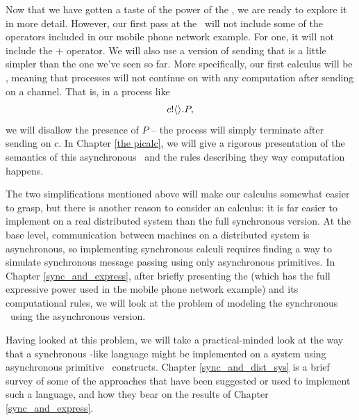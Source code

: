 	Now that we have gotten a taste of the power of the \picalc, we are ready to explore it in more detail.  
However, our first pass at the \picalc\ will not include some of the operators included in our mobile phone network example.  
For one, it will not include the $+$ operator.  
We will also use a version of sending that is a little simpler than the one we've seen so far.  
More specifically, our first calculus will be , meaning that processes will not continue on with any computation after sending on a channel.  
That is, in a process like
\[
	{c}!\langle{}\rangle.P,
\]
we will disallow the presence of $P$ -- the process will simply terminate after sending on $c$.  
In Chapter \ref{the picalc}, we will give a rigorous presentation of the semantics of this asynchronous \picalc\ and the rules describing they way computation happens.

The two simplifications mentioned above will make our calculus somewhat easier to grasp, but there is another reason to consider an  calculus: it is far easier to implement on a real distributed system than the full synchronous version.  
At the base level, communication between machines on a distributed system is asynchronous, so implementing synchronous calculi requires finding a way to simulate synchronous message passing using only asynchronous primitives.  
In Chapter \ref{sync_and_express}, after briefly presenting the  \picalc (which has the full expressive power used in the mobile phone network example) and its computational rules, we will look at the problem of modeling the synchronous \picalc\ using the asynchronous version.

Having looked at this problem, we will take a practical-minded look at the way that a synchronous \picalc-like language might be implemented on a system using asynchronous primitive \picalc\ constructs. 
Chapter \ref{sync_and_dist_sys} is a brief survey of some of the approaches that have been suggested or used to implement such a language, and how they bear on the results of Chapter \ref{sync_and_express}.